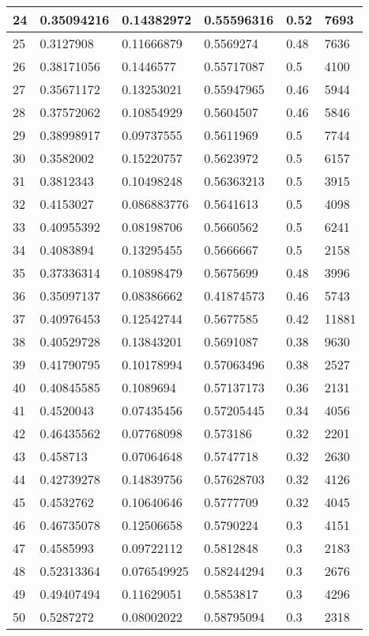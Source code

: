 \begin{longtable}{|l|l|l|l|l|l|}
24 & 0.35094216 & 0.14382972 & 0.55596316 & 0.52 & 7693 \\ \hline 
25 & 0.3127908 & 0.11666879 & 0.5569274 & 0.48 & 7636 \\ \hline 
26 & 0.38171056 & 0.1446577 & 0.55717087 & 0.5 & 4100 \\ \hline 
27 & 0.35671172 & 0.13253021 & 0.55947965 & 0.46 & 5944 \\ \hline 
28 & 0.37572062 & 0.10854929 & 0.5604507 & 0.46 & 5846 \\ \hline 
29 & 0.38998917 & 0.09737555 & 0.5611969 & 0.5 & 7744 \\ \hline 
30 & 0.3582002 & 0.15220757 & 0.5623972 & 0.5 & 6157 \\ \hline 
31 & 0.3812343 & 0.10498248 & 0.56363213 & 0.5 & 3915 \\ \hline 
32 & 0.4153027 & 0.086883776 & 0.5641613 & 0.5 & 4098 \\ \hline 
33 & 0.40955392 & 0.08198706 & 0.5660562 & 0.5 & 6241 \\ \hline 
34 & 0.4083894 & 0.13295455 & 0.5666667 & 0.5 & 2158 \\ \hline 
35 & 0.37336314 & 0.10898479 & 0.5675699 & 0.48 & 3996 \\ \hline 
36 & 0.35097137 & 0.08386662 & 0.41874573 & 0.46 & 5743 \\ \hline 
37 & 0.40976453 & 0.12542744 & 0.5677585 & 0.42 & 11881 \\ \hline 
38 & 0.40529728 & 0.13843201 & 0.5691087 & 0.38 & 9630 \\ \hline 
39 & 0.41790795 & 0.10178994 & 0.57063496 & 0.38 & 2527 \\ \hline 
40 & 0.40845585 & 0.1089694 & 0.57137173 & 0.36 & 2131 \\ \hline 
41 & 0.4520043 & 0.07435456 & 0.57205445 & 0.34 & 4056 \\ \hline 
42 & 0.46435562 & 0.07768098 & 0.573186 & 0.32 & 2201 \\ \hline 
43 & 0.458713 & 0.07064648 & 0.5747718 & 0.32 & 2630 \\ \hline 
44 & 0.42739278 & 0.14839756 & 0.57628703 & 0.32 & 4126 \\ \hline 
45 & 0.4532762 & 0.10640646 & 0.5777709 & 0.32 & 4045 \\ \hline 
46 & 0.46735078 & 0.12506658 & 0.5790224 & 0.3 & 4151 \\ \hline 
47 & 0.4585993 & 0.09722112 & 0.5812848 & 0.3 & 2183 \\ \hline 
48 & 0.52313364 & 0.076549925 & 0.58244294 & 0.3 & 2676 \\ \hline 
49 & 0.49407494 & 0.11629051 & 0.5853817 & 0.3 & 4296 \\ \hline 
50 & 0.5287272 & 0.08002022 & 0.58795094 & 0.3 & 2318 \\ \hline 
\end{longtable}